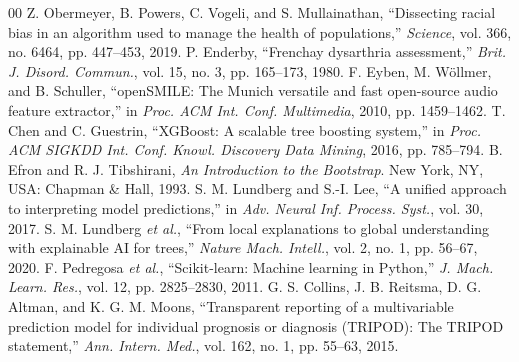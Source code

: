 \documentclass[conference]{IEEEtran}
\begin{document}
\begin{thebibliography}{00}
 Z. Obermeyer, B. Powers, C. Vogeli, and S. Mullainathan, ``Dissecting racial bias in an algorithm used to manage the health of populations,'' \emph{Science}, vol. 366, no. 6464, pp. 447--453, 2019.
 P. Enderby, ``Frenchay dysarthria assessment,'' \emph{Brit. J. Disord. Commun.}, vol. 15, no. 3, pp. 165--173, 1980.
 F. Eyben, M. W\"ollmer, and B. Schuller, ``openSMILE: The Munich versatile and fast open-source audio feature extractor,'' in \emph{Proc. ACM Int. Conf. Multimedia}, 2010, pp. 1459--1462.
 T. Chen and C. Guestrin, ``XGBoost: A scalable tree boosting system,'' in \emph{Proc. ACM SIGKDD Int. Conf. Knowl. Discovery Data Mining}, 2016, pp. 785--794.
 B. Efron and R. J. Tibshirani, \emph{An Introduction to the Bootstrap}. New York, NY, USA: Chapman \& Hall, 1993.
 S. M. Lundberg and S.-I. Lee, ``A unified approach to interpreting model predictions,'' in \emph{Adv. Neural Inf. Process. Syst.}, vol. 30, 2017.
 S. M. Lundberg \emph{et al.}, ``From local explanations to global understanding with explainable AI for trees,'' \emph{Nature Mach. Intell.}, vol. 2, no. 1, pp. 56--67, 2020.
 F. Pedregosa \emph{et al.}, ``Scikit-learn: Machine learning in Python,'' \emph{J. Mach. Learn. Res.}, vol. 12, pp. 2825--2830, 2011.
 G. S. Collins, J. B. Reitsma, D. G. Altman, and K. G. M. Moons, ``Transparent reporting of a multivariable prediction model for individual prognosis or diagnosis (TRIPOD): The TRIPOD statement,'' \emph{Ann. Intern. Med.}, vol. 162, no. 1, pp. 55--63, 2015.
\end{thebibliography}
\end{document}
